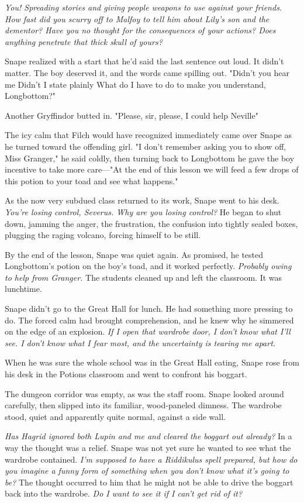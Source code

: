 \emph{You! Spreading stories and giving people weapons to use against your friends. How fast did you scurry off to Malfoy to tell him about Lily's son and the dementor? Have you no thought for the consequences of your actions? Does anything penetrate that thick skull of yours?}

Snape realized with a start that he'd said the last sentence out loud. It didn't matter. The boy deserved it, and the words came spilling out. "Didn't you hear me{\el} Didn't I state plainly{\el} What do I have to do to make you understand, Longbottom?"

Another Gryffindor butted in. "Please, sir, please, I could help Neville{\el}"

The icy calm that Filch would have recognized immediately came over Snape as he turned toward the offending girl. "I don't remember asking you to show off, Miss Granger," he said coldly, then turning back to Longbottom he gave the boy incentive to take more care—"At the end of this lesson we will feed a few drops of this potion to your toad and see what happens."

As the now very subdued class returned to its work, Snape went to his desk. \emph{You're losing control, Severus. Why are you losing control?} He began to shut down, jamming the anger, the frustration, the confusion into tightly sealed boxes, plugging the raging volcano, forcing himself to be still.

By the end of the lesson, Snape was quiet again. As promised, he tested Longbottom's potion on the boy's toad, and it worked perfectly. \emph{Probably owing to help from Granger.} The students cleaned up and left the classroom. It was lunchtime.

Snape didn't go to the Great Hall for lunch. He had something more pressing to do. The forced calm had brought comprehension, and he knew why he simmered on the edge of an explosion. \emph{If I open that wardrobe door, I don't know what I'll see. I don't know what I fear most, and the uncertainty is tearing me apart.}

When he was sure the whole school was in the Great Hall eating, Snape rose from his desk in the Potions classroom and went to confront his boggart.

The dungeon corridor was empty, as was the staff room. Snape looked around carefully, then slipped into its familiar, wood-paneled dimness. The wardrobe stood, quiet and apparently quite normal, against a side wall.

\emph{Has Hagrid ignored both Lupin and me and cleared the boggart out already?} In a way the thought was a relief. Snape was not yet sure he wanted to see what the wardrobe contained. \emph{I'm supposed to have a Riddikulus spell prepared, but how do you imagine a funny form of something when you don't know what it's going to be?} The thought occurred to him that he might not be able to drive the boggart back into the wardrobe. \emph{Do I want to see it if I can't get rid of it?}

